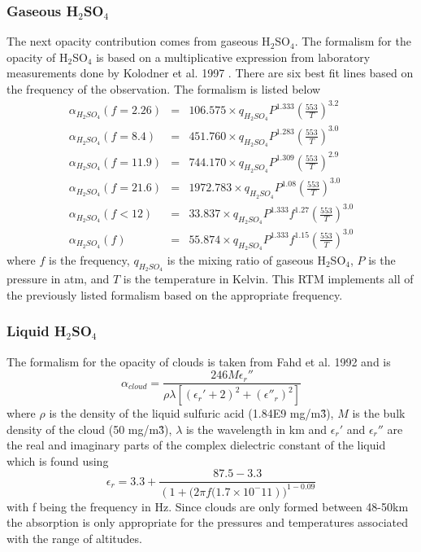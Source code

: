 \subsubsection{Gaseous H$_2$SO$_4$}
The next opacity contribution comes from gaseous H$_2$SO$_4$. The formalism for the opacity of H$_2$SO$_4$ is based on a multiplicative expression from laboratory measurements done by Kolodner et al. 1997 \cite{Kolodner-thesis}. There are six best fit lines based on the frequency of the observation. The formalism is listed below
\begin{eqnarray}
\alpha_{H_2SO_4}(f = 2.26) &=& 106.575 \times q_{H_2SO_4}P^{1.333}\left(\frac{553}{T}\right)^{3.2} \\
\alpha_{H_2SO_4}(f = 8.4)  &=& 451.760 \times q_{H_2SO_4}P^{1.283}\left(\frac{553}{T}\right)^{3.0} \\
\alpha_{H_2SO_4}(f = 11.9) &=& 744.170 \times q_{H_2SO_4}P^{1.309}\left(\frac{553}{T}\right)^{2.9} \\
\alpha_{H_2SO_4}(f = 21.6) &=& 1972.783 \times q_{H_2SO_4}P^{1.08}\left(\frac{553}{T}\right)^{3.0} \\
\alpha_{H_2SO_4}(f < 12)   &=& 33.837 \times q_{H_2SO_4}P^{1.333}f^{1.27}\left(\frac{553}{T}\right)^{3.0} \\
\alpha_{H_2SO_4}(f)        &=& 55.874 \times q_{H_2SO_4}P^{1.333}f^{1.15}\left(\frac{553}{T}\right)^{3.0} 
\end{eqnarray}
where $f$ is the frequency, $q_{H_2SO_4}$ is the mixing ratio of gaseous H$_2$SO$_4$, $P$ is the pressure in atm, and $T$ is the temperature in Kelvin. This RTM implements all of the previously listed formalism based on the appropriate frequency.

\subsubsection{Liquid H$_2$SO$_4$}
The formalism for the opacity of clouds is taken from Fahd et al. 1992 \cite{Fahd-thesis} and is
\begin{equation}
\alpha_{cloud} = \frac{246 M \epsilon_r''}{\rho \lambda \left[ (\epsilon_r' +2)^2 + (\epsilon''_r)^2\right]}
\end{equation}
where $\rho$ is the density of the liquid sulfuric acid (1.84E9 mg/m\^3), $M$ is the bulk density of the cloud (50 mg/m\^3), $\lambda$ is the wavelength in km and $\epsilon_r'$ and $\epsilon_r''$ are the real and imaginary parts of the complex dielectric constant of the liquid which is found using
\begin{equation}
\epsilon_r = 3.3+\frac{87.5-3.3}{\left(1+(2\pi f (1.7\times 10^-11\right))^{1-0.09}}
\end{equation} 
with f being the frequency in Hz. 
Since clouds are only formed between 48-50km the absorption is only appropriate for the pressures and temperatures associated with the range of altitudes. 

